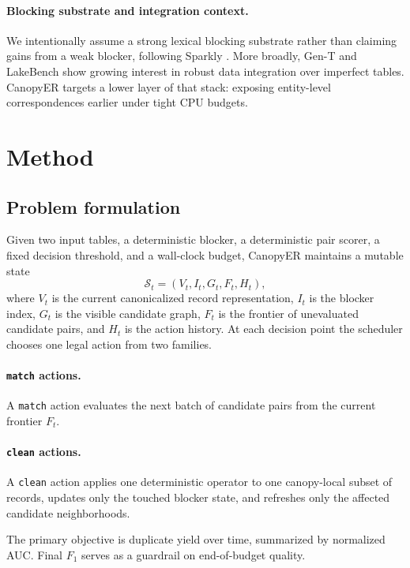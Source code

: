\documentclass{article}
\newcommand{\method}{CanopyER}
\newcommand{\nauc}{normalized AUC}
\newcommand{\matcha}{\texttt{match}}
\newcommand{\cleana}{\texttt{clean}}
\begin{document}
\paragraph{Blocking substrate and integration context.}
We intentionally assume a strong lexical blocking substrate rather than claiming gains from a weak blocker, following Sparkly \citep{paulsen2023sparkly}. More broadly, Gen-T \citep{fan2024gent} and LakeBench \citep{deng2024lakebench} show growing interest in robust data integration over imperfect tables. \method{} targets a lower layer of that stack: exposing entity-level correspondences earlier under tight CPU budgets.

\section{Method}
\label{sec:method}

\subsection{Problem formulation}

Given two input tables, a deterministic blocker, a deterministic pair scorer, a fixed decision threshold, and a wall-clock budget, \method{} maintains a mutable state
\[
\mathcal{S}_t = (V_t, I_t, G_t, F_t, H_t),
\]
where $V_t$ is the current canonicalized record representation, $I_t$ is the blocker index, $G_t$ is the visible candidate graph, $F_t$ is the frontier of unevaluated candidate pairs, and $H_t$ is the action history. At each decision point the scheduler chooses one legal action from two families.

\paragraph{\matcha{} actions.}
A \matcha{} action evaluates the next batch of candidate pairs from the current frontier $F_t$.

\paragraph{\cleana{} actions.}
A \cleana{} action applies one deterministic operator to one canopy-local subset of records, updates only the touched blocker state, and refreshes only the affected candidate neighborhoods.

The primary objective is duplicate yield over time, summarized by \nauc{}. Final $F_1$ serves as a guardrail on end-of-budget quality.
\end{document}
